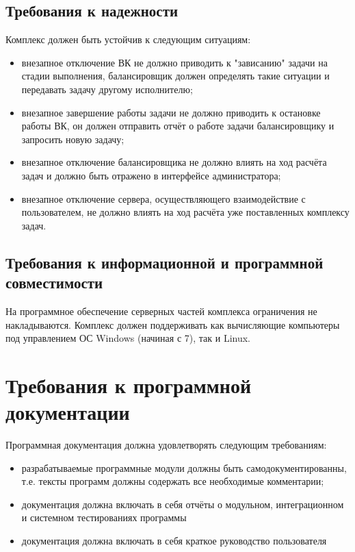 \documentclass[a4paper,12pt]{report}
\numberwithin{equation}{section}
\begin{document}
\subsection{Требования к надежности}
Комплекс должен быть устойчив к следующим ситуациям:
\begin{itemize}
  \item внезапное отключение ВК не должно приводить к "зависанию" задачи на стадии выполнения, балансировщик должен определять такие ситуации и передавать задачу другому исполнителю;
  \item внезапное завершение работы задачи не должно приводить к остановке работы ВК, он должен отправить отчёт о работе задачи балансировщику и запросить новую задачу;
  \item внезапное отключение балансировщика не должно влиять на ход расчёта задач и должно быть отражено в интерфейсе администратора;
  \item внезапное отключение сервера, осуществляющего взаимодействие с пользователем, не должно влиять на ход расчёта уже поставленных комплексу задач.
\end{itemize}

\subsection{Требования к информационной и программной совместимости}
На программное обеспечение серверных частей комплекса ограничения не накладываются. Комплекс должен поддерживать как вычисляющие компьютеры под управлением ОС Windows (начиная с 7), так и Linux.

\section{Требования к программной документации}
Программная документация должна удовлетворять следующим требованиям:
\begin{itemize}
  \item разрабатываемые программные модули должны быть самодокументированны, т.е. тексты программ должны содержать все необходимые комментарии;
  \item документация должна включать в себя отчёты о модульном, интеграционном и системном тестированиях программы
  \item документация должна включать в себя краткое руководство пользователя
\end{itemize}
\end{document}

